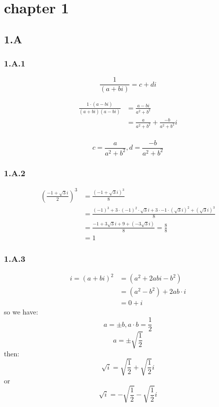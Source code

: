 \section{chapter 1}
\subsection*{1.A}
\subsubsection*{1.A.1}

\[\frac{1}{(a+bi)} = c + di \]

\begin{equation*}
\begin{split}
    \frac{1\cdot (a-bi)}{(a+bi)(a-bi)} & = \frac{a-bi}{a^2+b^2} \\
& = \frac{a}{a^2+b^2}+ \frac{-b}{a^2+b^2}i \\
\end{split}
\end{equation*}

\[c=\frac{a}{a^2+b^2} ,d=\frac{-b}{a^2+b^2}\]

\subsubsection*{1.A.2}
\begin{equation*}
\begin{split}
    \left( \frac{-1+\sqrt{3}i}{2}\right ) ^3 &= \frac{(-1+\sqrt{3}i)^3}{8} \\
    &= \frac{(-1)^3+3\cdot (-1)^2 \cdot \sqrt{3}i + 3 \cdot -1 \cdot (\sqrt{3}i)^2 + (\sqrt{3}i)^3}{8} \\
    & = \frac{-1 + 3\sqrt{3}i + 9 + (-3\sqrt{3}i)}{8} = \frac{8}{8} \\
    & = 1
\end{split}
\end{equation*}

\subsubsection*{1.A.3}

\begin{equation*}
    \begin{split}
        i = (a+bi)^2 & = (a^2 + 2abi - b^2) \\
        & = (a^2 - b^2) + 2ab\cdot i \\
        & = 0 + i
    \end{split}
\end{equation*}
so we have:
\[a=\pm b, a\cdot b = \frac{1}{2} \]
\[a= \pm \sqrt{\frac{1}{2}}\]
then:
\[\sqrt{i} = \sqrt{\frac{1}{2}} + \sqrt{\frac{1}{2}}i\]
or
\[\sqrt{i} = -\sqrt{\frac{1}{2}} - \sqrt{\frac{1}{2}}i\]

